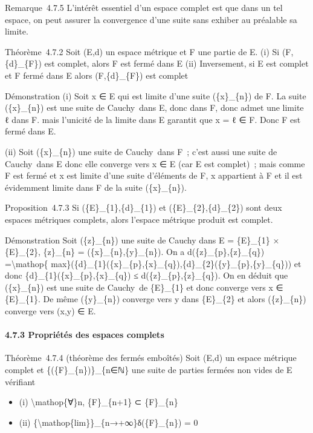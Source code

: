 \documentclass[]{article}
\begin{document}
Remarque~4.7.5 L'intérêt essentiel d'un espace complet est que dans un
tel espace, on peut assurer la convergence d'une suite sans exhiber au
préalable sa limite.

Théorème~4.7.2 Soit (E,d) un espace métrique et F une partie de E. (i)
Si (F,\{d\}\_\{F\}) est complet, alors F est fermé dans E (ii)
Inversement, si E est complet et F fermé dans E alors (F,\{d\}\_\{F\})
est complet

Démonstration (i) Soit x ∈ E qui est limite d'une suite (\{x\}\_\{n\})
de F. La suite (\{x\}\_\{n\}) est une suite de Cauchy~dans E, donc dans
F, donc admet une limite ℓ dans F. mais l'unicité de la limite dans E
garantit que x = ℓ ∈ F. Donc F est fermé dans E.

(ii) Soit (\{x\}\_\{n\}) une suite de Cauchy~dans F~; c'est aussi une
suite de Cauchy~dans E donc elle converge vers x ∈ E (car E est
complet)~; mais comme F est fermé et x est limite d'une suite d'éléments
de F, x appartient à F et il est évidemment limite dans F de la suite
(\{x\}\_\{n\}).

Proposition~4.7.3 Si (\{E\}\_\{1\},\{d\}\_\{1\}) et
(\{E\}\_\{2\},\{d\}\_\{2\}) sont deux espaces métriques complets, alors
l'espace métrique produit est complet.

Démonstration Soit (\{z\}\_\{n\}) une suite de Cauchy dans E =
\{E\}\_\{1\} × \{E\}\_\{2\}, \{z\}\_\{n\} = (\{x\}\_\{n\},\{y\}\_\{n\}).
On a d(\{z\}\_\{p\},\{z\}\_\{q\}) =\textbackslash{}mathop\{
max\}(\{d\}\_\{1\}(\{x\}\_\{p\},\{x\}\_\{q\}),\{d\}\_\{2\}(\{y\}\_\{p\},\{y\}\_\{q\}))
et donc \{d\}\_\{1\}(\{x\}\_\{p\},\{x\}\_\{q\}) ≤
d(\{z\}\_\{p\},\{z\}\_\{q\}). On en déduit que (\{x\}\_\{n\}) est une
suite de Cauchy~de \{E\}\_\{1\} et donc converge vers x ∈ \{E\}\_\{1\}.
De même (\{y\}\_\{n\}) converge vers y dans \{E\}\_\{2\} et alors
(\{z\}\_\{n\}) converge vers (x,y) ∈ E.

\paragraph{4.7.3 Propriétés des espaces complets}

Théorème~4.7.4 (théorème des fermés emboîtés) Soit (E,d) un espace
métrique complet et \{(\{F\}\_\{n\})\}\_\{n∈ℕ\} une suite de parties
fermées non vides de E vérifiant

\begin{itemize}
\itemsep1pt\parskip0pt
\item
  (i) \textbackslash{}mathop\{∀\}n, \{F\}\_\{n+1\} ⊂ \{F\}\_\{n\}
\item
  (ii) \{\textbackslash{}mathop\{lim\}\}\_\{n→+∞\}δ(\{F\}\_\{n\}) = 0
\end{itemize}
\end{document}
